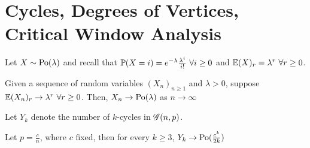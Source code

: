\section{Cycles, Degrees of Vertices, Critical Window Analysis}

Let $X \sim \operatorname{\mathrm{Po}}(\lambda)$ and recall that $\operatorname{\mathbb{P}}(X = i) = e^{-\lambda}\frac{\lambda^i}{i!} \ \forall i \geq 0$ and $\operatorname{\mathbb{E}}(X)_r = \lambda^r \ \forall r \geq 0$.

\begin{theorem}
    Given a sequence of random variables $(X_n)_{n \geq 1}$ and $\lambda > 0$, suppose $\E(X_n)_r \rightarrow \lambda^r \ \forall r \geq 0$. Then, $X_n \rightarrow \operatorname{\mathrm{Po}}(\lambda)$ as $n \rightarrow \infty$ 
\end{theorem}

Let $Y_k$ denote the number of $k$-cycles in $\operatorname{\mathscr{G}}(n, p)$.
\begin{theorem}
    Let $p = \frac{c}{n}$, where $c$ fixed, then for every $k \geq 3$, $Y_k \rightarrow \operatorname{\mathrm{Po}}(\frac{c^k}{2k})$
\end{theorem}